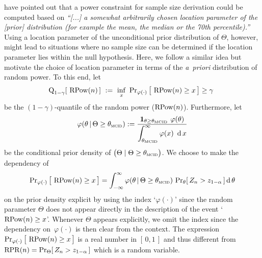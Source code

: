 \documentclass{article}
\renewcommand{\Pr}{\operatorname{Pr}}
\begin{document}
\citet{spiegelhalter1986} have pointed out that a power constraint for sample size derivation could be computed based on \textit{``[...] a somewhat arbitrarily chosen location parameter of the [prior] distribution (for example the mean, the median or the 70th percentile).''}
Using a location parameter of the unconditional prior distribution of $\Theta$, however, might lead to situations where no sample size can be determined if the location parameter lies within the null hypothesis.
Here, we follow a similar idea but motivate the choice of location parameter in terms of the \textit{a~priori} distribution of random power.
To this end, let
\newcommand{\quant}[1]{{\operatorname{Q}_{ #1 }}}
\begin{align}
    \quant{ 1-\gamma }[\ \rpower{n} \,] \ := \
    \inf_{x}\ \Pr_{\varphi(\cdot)}\big[\, \rpower{n} \geq x \,\big] \geq \gamma\
\end{align}
be the $(1-\gamma)$-quantile of the random power ($\operatorname{RPow}({ n })$).
Furthermore, let
\begin{align}
    \varphi(\theta\,|\,\Theta\geq \mcid):= \frac{\displaystyle \boldsymbol{1}_{\theta\geq \mcid} \ \varphi(\theta)}{\displaystyle \int_{\mcid}^\infty \varphi(x)\ \operatorname{d} x } \label{eq:conditional-prior-density}
\end{align}
be the conditional prior density of $\big(\Theta \mid \Theta \geq \mcid \big)$.
We choose to make the dependency of \begin{align}
    \Pr_{\varphi(\cdot)}\big[\, \rpower{n} \geq x \,\big] = \int_{-\infty}^{\infty} \varphi(\theta\,|\,\Theta\geq \mcid)\, \Pr_{ \theta}[\,Z_n > \criticalvalue\,] \operatorname{d}\theta
\end{align}
on the prior density explicit by using the index `$\varphi(\cdot)$' since the random parameter $\Theta$ does not appear directly in the description of the event `$\operatorname{RPow}({ n }) \geq x$'.
Whenever $\Theta$ appears explicitly, we omit the index since the dependency on~$\varphi(\cdot)$ is then clear from the context.
The expression ${\Pr_{\varphi(\cdot)}\big[\, \rpower{n} \geq x \,\big]}$ is a real number in ${[\,0, 1\,]}$ and thus different from  $\rpr(n)=\Pr_{\Theta}[\,Z_n > \criticalvalue\,]$ which is a random variable.
\end{document}
